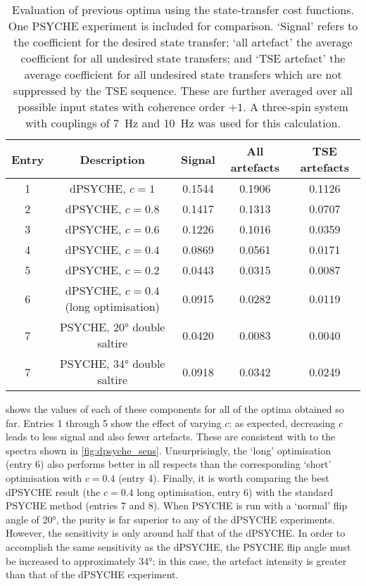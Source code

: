 \begin{table}[htb]
    \begin{tabular}{ccccc}
        \toprule
        \textbf{Entry} & \textbf{Description} & \textbf{Signal} & \textbf{All artefacts} & \textbf{TSE artefacts} \\
        \midrule
        1 & dPSYCHE, $c = 1$                       & 0.1544 & 0.1906 & 0.1126 \\
        2 & dPSYCHE, $c = 0.8$                     & 0.1417 & 0.1313 & 0.0707 \\
        3 & dPSYCHE, $c = 0.6$                     & 0.1226 & 0.1016 & 0.0359 \\
        4 & dPSYCHE, $c = 0.4$                     & 0.0869 & 0.0561 & 0.0171 \\
        5 & dPSYCHE, $c = 0.2$                     & 0.0443 & 0.0315 & 0.0087 \\
        6 & dPSYCHE, $c = 0.4$ (long optimisation) & 0.0915 & 0.0282 & 0.0119 \\
        7 & PSYCHE, \ang{20} double saltire        & 0.0420 & 0.0083 & 0.0040 \\
        7 & PSYCHE, \ang{34} double saltire        & 0.0918 & 0.0342 & 0.0249 \\
        \bottomrule
    \end{tabular}
    \caption[Evaluation of previous optima using state-transfer cost functions]{
        Evaluation of previous optima using the state-transfer cost functions.
        One PSYCHE experiment is included for comparison.
        `Signal' refers to the coefficient for the desired state transfer;
        `all artefact' the average coefficient for all undesired state transfers;
        and `TSE artefact' the average coefficient for all undesired state transfers which are not suppressed by the TSE sequence.
        These are further averaged over all possible input states with coherence order $+1$.
        A three-spin system with couplings of \qty{7}{\Hz} and \qty{10}{\Hz} was used for this calculation.
    }
    \label{tbl:specopt_to_states}
\end{table}

 shows the values of each of these components for all of the optima obtained so far.
Entries 1 through 5 show the effect of varying $c$: as expected, decreasing $c$ leads to less signal and also fewer artefacts.
These are consistent with to the spectra shown in \cref{fig:dpsyche_sens}.
Unsurprisingly, the `long' optimisation (entry 6) also performs better in all respects than the corresponding `short' optimisation with $c = 0.4$ (entry 4).
Finally, it is worth comparing the best dPSYCHE result (the $c = 0.4$ long optimisation, entry 6) with the standard PSYCHE method (entries 7 and 8).
When PSYCHE is run with a `normal' flip angle of \ang{20}, the purity is far superior to any of the dPSYCHE experiments.
However, the sensitivity is only around half that of the dPSYCHE.
In order to accomplish the same sensitivity as the dPSYCHE, the PSYCHE flip angle must be increased to approximately \ang{34}; in this case, the artefact intensity is greater than that of the dPSYCHE experiment.

